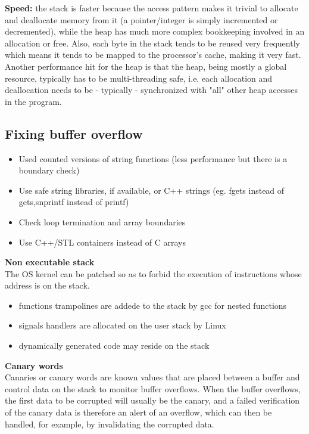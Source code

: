 \documentclass[10pt,a4paper]{article}
\begin{document}
\textbf{Speed:} the stack is faster because the access pattern makes it trivial to allocate and deallocate memory from it (a pointer/integer is simply incremented or decremented), while the heap has much more complex bookkeeping involved in an allocation or free. Also, each byte in the stack tends to be reused very frequently which means it tends to be mapped to the processor's cache, making it very fast. Another performance hit for the heap is that the heap, being mostly a global resource, typically has to be multi-threading safe, i.e. each allocation and deallocation needs to be - typically - synchronized with "all" other heap accesses in the program.

\subsection{Fixing buffer overflow}
\begin{itemize}
\item Used counted versions of string functions (less performance but there is a boundary check)
\item Use safe string libraries, if available, or C++ strings (eg. fgets instead of gets,snprintf instead of printf)
\item Check loop termination and array boundaries
\item Use C++/STL containers instead of C arrays
\end{itemize}
\textbf{Non executable stack}\\
The OS kernel can be patched so as to forbid the execution of instructions whose address is on the stack.
\begin{itemize}
\item functions trampolines are addede to the stack by gcc for nested functions
\item signals handlers are allocated on the user stack by Linux
\item dynamically generated code may reside on the stack
\end{itemize}
\textbf{Canary words}\\
Canaries or canary words are known values that are placed between a buffer and control data on the stack to monitor buffer overflows. When the buffer overflows, the first data to be corrupted will usually be the canary, and a failed verification of the canary data is therefore an alert of an overflow, which can then be handled, for example, by invalidating the corrupted data.
\newpage
\end{document}

